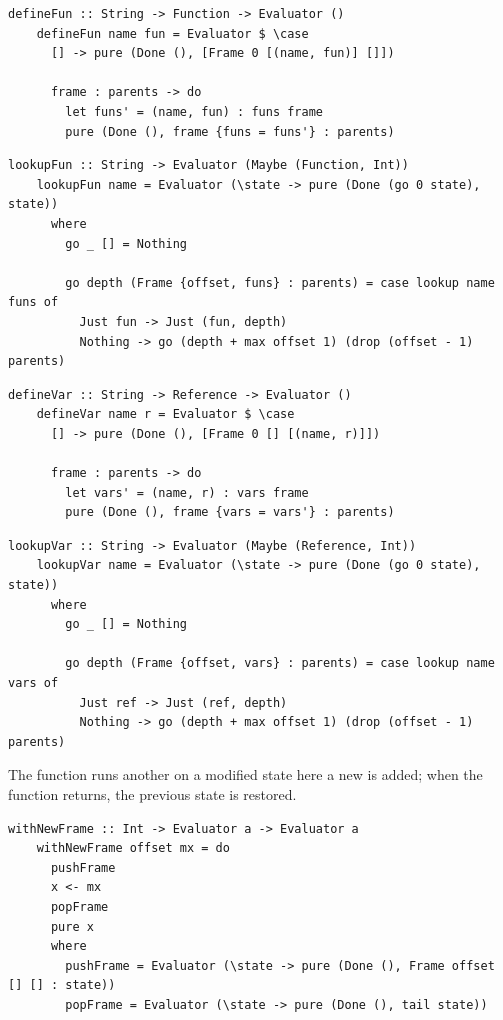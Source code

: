 \documentclass[UdineBachThesis,american,11pt,draft]{PhdThesis}
\begin{document}
  \begin{lstlisting}[gobble=4,basicstyle=\ttfamily\small]
    defineFun :: String -> Function -> Evaluator ()
    defineFun name fun = Evaluator $ \case
      [] -> pure (Done (), [Frame 0 [(name, fun)] []])

      frame : parents -> do
        let funs' = (name, fun) : funs frame
        pure (Done (), frame {funs = funs'} : parents)
  \end{lstlisting}

  \begin{lstlisting}[gobble=4,basicstyle=\ttfamily\small]
    lookupFun :: String -> Evaluator (Maybe (Function, Int))
    lookupFun name = Evaluator (\state -> pure (Done (go 0 state), state))
      where
        go _ [] = Nothing

        go depth (Frame {offset, funs} : parents) = case lookup name funs of
          Just fun -> Just (fun, depth)
          Nothing -> go (depth + max offset 1) (drop (offset - 1) parents)
  \end{lstlisting}

  \begin{lstlisting}[gobble=4,basicstyle=\ttfamily\small]
    defineVar :: String -> Reference -> Evaluator ()
    defineVar name r = Evaluator $ \case
      [] -> pure (Done (), [Frame 0 [] [(name, r)]])

      frame : parents -> do
        let vars' = (name, r) : vars frame
        pure (Done (), frame {vars = vars'} : parents)
  \end{lstlisting}

  \begin{lstlisting}[gobble=4,basicstyle=\ttfamily\small]
    lookupVar :: String -> Evaluator (Maybe (Reference, Int))
    lookupVar name = Evaluator (\state -> pure (Done (go 0 state), state))
      where
        go _ [] = Nothing

        go depth (Frame {offset, vars} : parents) = case lookup name vars of
          Just ref -> Just (ref, depth)
          Nothing -> go (depth + max offset 1) (drop (offset - 1) parents)
  \end{lstlisting}

  The function \lstinline@withNewFrame@ runs another \lstinline@Evaluator@ on
  a modified state here a new \lstinline@Frame@ is added; when the function
  returns, the previous state is restored.

  \begin{lstlisting}[gobble=4,basicstyle=\ttfamily\small]
    withNewFrame :: Int -> Evaluator a -> Evaluator a
    withNewFrame offset mx = do
      pushFrame
      x <- mx
      popFrame
      pure x
      where
        pushFrame = Evaluator (\state -> pure (Done (), Frame offset [] [] : state))
        popFrame = Evaluator (\state -> pure (Done (), tail state))
  \end{lstlisting}
\end{document}
